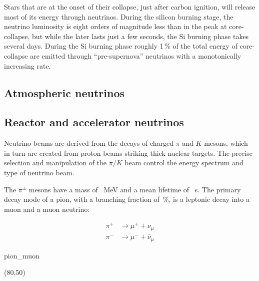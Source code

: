 Stars that are at the onset of their collapse, just after carbon ignition, will release most of its energy through neutrinos.
During the silicon burning stage, the neutrino luminosity is eight orders of magnitude less than %
in the peak at core-collapse, but while the later lasts just a few seconds, %
the Si burning phase takes several days.
During the Si burning phase roughly 1\,\% of the total energy of core-collapse are emitted through
``pre-supernova'' neutrinos with a monotonically increasing rate.

\subsection{Atmospheric neutrinos}

\subsection{Reactor and accelerator neutrinos}

Neutrino beams are derived from the decays of charged $\pi$ and $K$ mesons, which in turn are created from %
proton beams striking thick nuclear targets.
The precise selection and manipulation of the $\pi/K$ beam control the energy spectrum and type of neutrino beam.

The $\pi^{\pm}$ mesons have a mass of ~MeV and a mean lifetime of ~s.
The primary decay mode of a pion, with a branching fraction of \,\%, is a leptonic %
decay into a muon and a muon neutrino:

\begin{minipage}[c][3cm][c]{0.5\textwidth}
	\centering
	\begin{align}
		\pi^+ &\rightarrow \mu^+ + \nu_\mu \\
		\pi^- &\rightarrow \mu^- + \bar{\nu}_\mu
	\end{align}
\end{minipage}
%
\begin{minipage}[c][3cm][c]{0.5\textwidth}
	\centering
	\begin{fmffile}{pion_muon}
		\begin{fmfgraph*}(80,50)
		\end{fmfgraph*}
	\end{fmffile}
\end{minipage}

